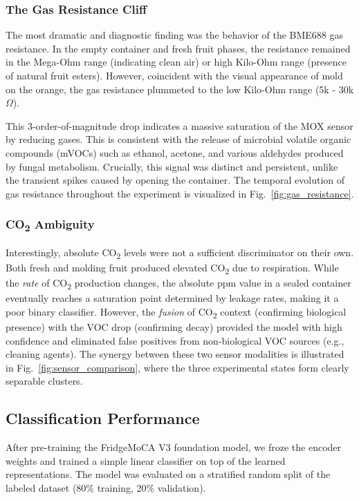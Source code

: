 \documentclass[conference]{IEEEtran}
\begin{document}
    \subsubsection{The Gas Resistance Cliff}
    The most dramatic and diagnostic finding was the behavior of the BME688 gas resistance. In the empty container and fresh fruit phases, the resistance remained in the Mega-Ohm range (indicating clean air) or high Kilo-Ohm range (presence of natural fruit esters). However, coincident with the visual appearance of mold on the orange, the gas resistance plummeted to the low Kilo-Ohm range (5k - 30k $\Omega$).

    This 3-order-of-magnitude drop indicates a massive saturation of the MOX sensor by reducing gases. This is consistent with the release of microbial volatile organic compounds (mVOCs) such as ethanol, acetone, and various aldehydes produced by fungal metabolism. Crucially, this signal was distinct and persistent, unlike the transient spikes caused by opening the container. The temporal evolution of gas resistance throughout the experiment is visualized in Fig.~\ref{fig:gas_resistance}.

    

    \subsubsection{\texorpdfstring{CO\textsubscript{2}}{CO2} Ambiguity}
    Interestingly, absolute CO\textsubscript{2} levels were not a sufficient discriminator on their own. Both fresh and molding fruit produced elevated CO\textsubscript{2} due to respiration. While the \textit{rate} of CO\textsubscript{2} production changes, the absolute ppm value in a sealed container eventually reaches a saturation point determined by leakage rates, making it a poor binary classifier. However, the \textit{fusion} of CO\textsubscript{2} context (confirming biological presence) with the VOC drop (confirming decay) provided the model with high confidence and eliminated false positives from non-biological VOC sources (e.g., cleaning agents). The synergy between these two sensor modalities is illustrated in Fig.~\ref{fig:sensor_comparison}, where the three experimental states form clearly separable clusters.

    

    \subsection{Classification Performance}
    After pre-training the FridgeMoCA V3 foundation model, we froze the encoder weights and trained a simple linear classifier on top of the learned representations. The model was evaluated on a stratified random split of the labeled dataset (80\% training, 20\% validation).
\end{document}
